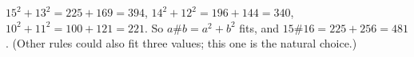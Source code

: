 $15^2+13^2=225+169=394$, $14^2+12^2=196+144=340$, $10^2+11^2=100+121=221$. So $a\#b=a^2+b^2$ fits, and $15\#16=225+256=\boxed{481}$. (Other rules could also fit three values; this one is the natural choice.)
